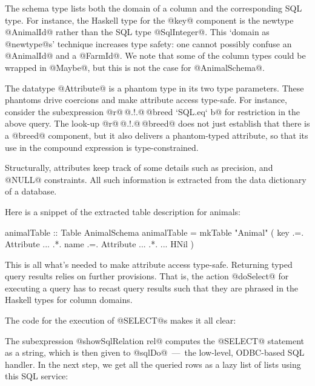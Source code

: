 \documentclass[nocopyrightspace,preprint]{sigplan-proc}
\begin{document}
The schema type lists both the domain of a column and the
corresponding SQL type. For instance, the Haskell type for the @key@
component is the newtype @AnimalId@ rather than the SQL type
@SqlInteger@. This `domain as @newtype@s' technique increases type
safety: one cannot possibly confuse an @AnimalId@ and a @FarmId@.  We
note that some of the column types could be wrapped in @Maybe@, but
this is not the case for @AnimalSchema@.

The datatype @Attribute@ is a phantom type in its two type
parameters. These phantoms drive coercions and make attribute
access type-safe. For instance, consider the subexpression
%
@r@\,@.!.@\,@breed `SQL.eq` b@ for restriction in the above
query. The look-up @r@\,@.!.@\,@breed@ does not just establish that
there is a @breed@ component, but it also delivers a phantom-typed
attribute, so that its use in the compound expression is
type-constrained.

Structurally, attributes keep track of some details such as precision,
and @NULL@ constraints. All such information is extracted from the
data dictionary of a database.

Here is a snippet of the extracted table description for animals:

\begin{code}
 animalTable :: Table AnimalSchema
 animalTable =  mkTable "Animal" (
  key  .=. Attribute { ... } .*.
  name .=. Attribute { ... } .*.
  ... HNil )
\end{code}

This is all what's needed to make attribute access type-safe.
Returning typed query results relies on further provisions. That is,
the action @doSelect@ for executing a query has to recast query
results such that they are phrased in the Haskell types for column
domains.

The code for the execution of @SELECT@s makes it all clear:


The subexpression @showSqlRelation rel@ computes the @SELECT@
statement as a string, which is then given to @sqlDo@~---~the
low-level, ODBC-based SQL handler. In the next step, we get all the
queried rows as a lazy list of lists using this SQL service:
\end{document}
